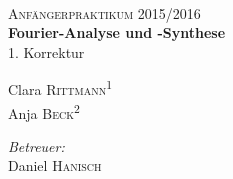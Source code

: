 \begin{titlepage}
	\par
	\hfill
	\par
\begin{center}
\ \\
[5cm]	
	\textsc{\Huge Anfängerpraktikum 2015/2016} \\
[2cm]
	\Huge\textbf{Fourier-Analyse und -Synthese} \\
[1cm]
	{\huge 1. Korrektur} \\
[4cm]
\begin{minipage}{0.4\textwidth}
	\begin{flushleft} \large
		Clara \textsc{Rittmann}\textsuperscript{1} \\
		Anja \textsc{Beck}\textsuperscript{2}
	\end{flushleft}
\end{minipage}
\hfill
\begin{minipage}{0.4\textwidth}
	\begin{flushright} \large
		\emph{Betreuer:} \\
		Daniel \textsc{Hanisch}
	\end{flushright}
\end{minipage}
\end{center}
\end{titlepage}